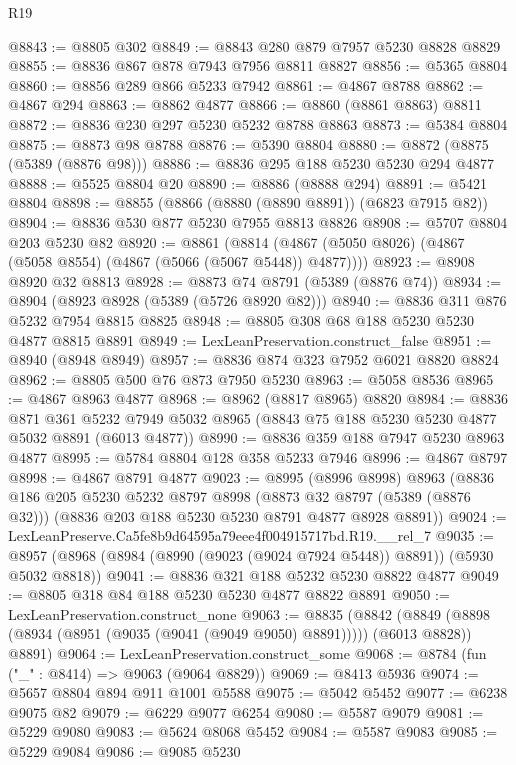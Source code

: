 \begin{lexlean}{R19}
\begin{coremodule}
@8843 := @8805 @302
@8849 := @8843 @280 @879 @7957 @5230 @8828 @8829
@8855 := @8836 @867 @878 @7943 @7956 @8811 @8827
@8856 := @5365 @8804
@8860 := @8856 @289 @866 @5233 @7942
@8861 := @4867 @8788
@8862 := @4867 @294
@8863 := @8862 @4877
@8866 := @8860 (@8861 @8863) @8811
@8872 := @8836 @230 @297 @5230 @5232 @8788 @8863
@8873 := @5384 @8804
@8875 := @8873 @98 @8788
@8876 := @5390 @8804
@8880 := @8872 (@8875 (@5389 (@8876 @98)))
@8886 := @8836 @295 @188 @5230 @5230 @294 @4877
@8888 := @5525 @8804 @20
@8890 := @8886 (@8888 @294)
@8891 := @5421 @8804
@8898 := @8855 (@8866 (@8880 (@8890 @8891)) (@6823 @7915 @82))
@8904 := @8836 @530 @877 @5230 @7955 @8813 @8826
@8908 := @5707 @8804 @203 @5230 @82
@8920 := @8861
    (@8814 (@4867 (@5050 @8026) (@4867 (@5058 @8554) (@4867 (@5066 (@5067 @5448)) @4877))))
@8923 := @8908 @8920 @32 @8813
@8928 := @8873 @74 @8791 (@5389 (@8876 @74))
@8934 := @8904 (@8923 @8928 (@5389 (@5726 @8920 @82)))
@8940 := @8836 @311 @876 @5232 @7954 @8815 @8825
@8948 := @8805 @308 @68 @188 @5230 @5230 @4877 @8815 @8891
@8949 := LexLeanPreservation.construct_false
@8951 := @8940 (@8948 @8949)
@8957 := @8836 @874 @323 @7952 @6021 @8820 @8824
@8962 := @8805 @500 @76 @873 @7950 @5230
@8963 := @5058 @8536
@8965 := @4867 @8963 @4877
@8968 := @8962 (@8817 @8965) @8820
@8984 := @8836
    @871
    @361
    @5232
    @7949
    @5032
    @8965
    (@8843 @75 @188 @5230 @5230 @4877 @5032 @8891 (@6013 @4877))
@8990 := @8836 @359 @188 @7947 @5230 @8963 @4877
@8995 := @5784 @8804 @128 @358 @5233 @7946
@8996 := @4867 @8797
@8998 := @4867 @8791 @4877
@9023 := @8995
    (@8996 @8998)
    @8963
    (@8836
      @186
      @205
      @5230
      @5232
      @8797
      @8998
      (@8873 @32 @8797 (@5389 (@8876 @32)))
      (@8836 @203 @188 @5230 @5230 @8791 @4877 @8928 @8891))
@9024 := LexLeanPreserve.Ca5fe8b9d64595a79eee4f004915717bd.R19.__rel_7
@9035 := @8957 (@8968 (@8984 (@8990 (@9023 (@9024 @7924 @5448)) @8891)) (@5930 @5032 @8818))
@9041 := @8836 @321 @188 @5232 @5230 @8822 @4877
@9049 := @8805 @318 @84 @188 @5230 @5230 @4877 @8822 @8891
@9050 := LexLeanPreservation.construct_none
@9063 := @8835
    (@8842 (@8849 (@8898 (@8934 (@8951 (@9035 (@9041 (@9049 @9050) @8891))))) (@6013 @8828)) @8891)
@9064 := LexLeanPreservation.construct_some
@9068 := @8784 (fun ("_" : @8414) => @9063 (@9064 @8829))
@9069 := @8413 @5936
@9074 := @5657 @8804 @894 @911 @1001 @5588
@9075 := @5042 @5452
@9077 := @6238 @9075 @82
@9079 := @6229 @9077 @6254
@9080 := @5587 @9079
@9081 := @5229 @9080
@9083 := @5624 @8068 @5452
@9084 := @5587 @9083
@9085 := @5229 @9084
@9086 := @9085 @5230

\end{coremodule}
\end{lexlean}
